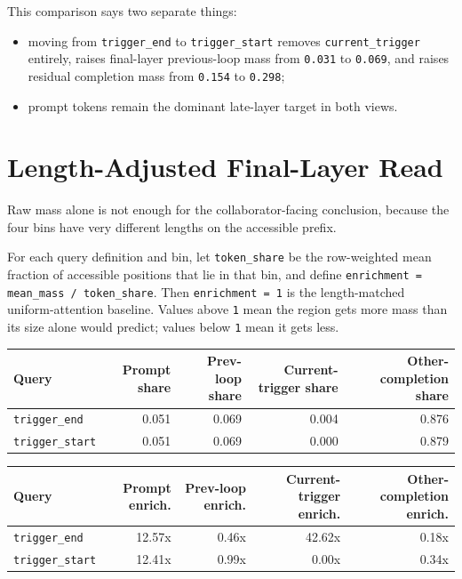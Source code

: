 \documentclass[11pt]{article}
\begin{document}
This comparison says two separate things:

\begin{itemize}
  \item moving from \texttt{trigger\_end} to \texttt{trigger\_start} removes \texttt{current\_trigger} entirely, raises final-layer previous-loop mass from \texttt{0.031} to \texttt{0.069}, and raises residual completion mass from \texttt{0.154} to \texttt{0.298};
  \item prompt tokens remain the dominant late-layer target in both views.
\end{itemize}

\section*{Length-Adjusted Final-Layer Read}

Raw mass alone is not enough for the collaborator-facing conclusion, because the four bins have very different lengths on the accessible prefix.

For each query definition and bin, let \texttt{token\_share} be the row-weighted mean fraction of accessible positions that lie in that bin, and define \texttt{enrichment = mean\_mass / token\_share}. Then \texttt{enrichment = 1} is the length-matched uniform-attention baseline. Values above \texttt{1} mean the region gets more mass than its size alone would predict; values below \texttt{1} mean it gets less.

\begin{center}
\scriptsize
\begin{tabular}{lrrrr}
\toprule
Query & Prompt share & Prev-loop share & Current-trigger share & Other-completion share \\
\midrule
\texttt{trigger\_end} & 0.051 & 0.069 & 0.004 & 0.876 \\
\texttt{trigger\_start} & 0.051 & 0.069 & 0.000 & 0.879 \\
\bottomrule
\end{tabular}
\normalsize
\end{center}

\begin{center}
\scriptsize
\begin{tabular}{lrrrr}
\toprule
Query & Prompt enrich. & Prev-loop enrich. & Current-trigger enrich. & Other-completion enrich. \\
\midrule
\texttt{trigger\_end} & 12.57x & 0.46x & 42.62x & 0.18x \\
\texttt{trigger\_start} & 12.41x & 0.99x & 0.00x & 0.34x \\
\bottomrule
\end{tabular}
\normalsize
\end{center}
\end{document}
